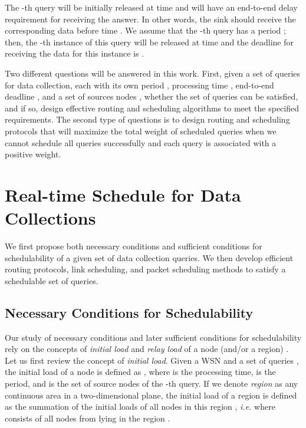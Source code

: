 \documentclass[conference,10pt]{IEEEtran}\usepackage{amsmath}
\def\ie{\textit{i.e.}\xspace}
\begin{document}
The -th query  will be initially released at time
  and will have an end-to-end delay
 requirement   for receiving the answer.
In other words, the sink should receive the corresponding data before time
 .
We  assume that the -th query has a period ;
 then, the -th instance of this query   will be released
 at time  and the deadline for receiving
 the data for this instance is .

Two different questions will be answered in this work. First, given
a set of  queries  for data collection,
 each with its own period ,
processing time  ,  end-to-end deadline
, and a set of sources nodes ,
 whether the set of queries can be satisfied, and if so, design
 effective routing and scheduling algorithms to meet the specified requirements.
The second type of questions is to
design routing and scheduling
 protocols that will maximize the total weight of scheduled queries
 when we cannot schedule all queries successfully and each query is
 associated with a positive weight.




\section{Real-time Schedule for Data Collections}
\label{sec:col}

We first propose both necessary conditions and
 sufficient conditions for schedulability of a given set of data collection queries.
We then develop efficient  routing protocols, link scheduling, and
packet
 scheduling methods to satisfy a schedulable set of queries.

\subsection{Necessary Conditions for Schedulability}
Our study of necessary conditions and later sufficient conditions
 for schedulability rely on
 the concepts of \emph{initial load} and \emph{relay
 load} of a node (and/or a region) \cite{xu2012efficient}.
Let us first review the concept of \emph{initial load}. Given a
WSN   and a set of queries , the initial load of
a node
  is defined as
 ,
where  is the processing time,  is the
 period, and 
 is the set of source nodes of the -th query.
If we denote \emph{region} as any continuous area in a
two-dimensional plane, the initial load of a region  is defined
as the summation of the
 initial loads of
 all nodes in this region , \ie
  where
 consists of all nodes from  lying in the region .
\end{document}
